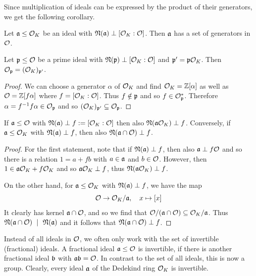 Since multiplication of ideals can be expressed by the product of their generators, we get the following corollary.
\begin{corollary}
    \label{prop:generators_in_order}
    Let $\mathfrak{a} \leq \mathcal{O}_K$ be an ideal with $\mathfrak{N}(\mathfrak{a}) \perp [\mathcal{O}_K : \mathcal{O}]$. Then $\mathfrak{a}$ has a set of generators in $\mathcal{O}$.
\end{corollary}
\begin{prop}
    \label{prop:prime_coprime_localization_same}
    Let $\mathfrak{p} \leq \mathcal{O}$ be a prime ideal with $\mathfrak{N}(\mathfrak{p}) \perp [\mathcal{O}_K : \mathcal{O}]$ and $\mathfrak{p}' = \mathfrak{p}\mathcal{O}_K$.
    Then $\mathcal{O}_{\mathfrak{p}} = (\mathcal{O}_K)_{\mathfrak{p}'}$.
\end{prop}
\begin{proof}
    We can choose a generator $\alpha$ of $\mathcal{O}_K$ and find $\mathcal{O}_K = \mathbb{Z}[\alpha]$ as well as $\mathcal{O} = \mathbb{Z}[f\alpha]$ where $f = [\mathcal{O}_K : \mathcal{O}]$.
    Thus $f \notin \mathfrak{p}$ and so $f \in \mathcal{O}_{\mathfrak{p}}^*$.
    Therefore $\alpha = f^{-1}f\alpha \in \mathcal{O}_{\mathfrak{p}}$ and so $(\mathcal{O}_K)_{\mathfrak{p}'} \subseteq \mathcal{O}_{\mathfrak{p}}$.
\end{proof}
\begin{lemma}
    If $\mathfrak{a} \leq \mathcal{O}$ with $\mathfrak{N}(\mathfrak{a}) \perp f := [\mathcal{O}_K : \mathcal{O}]$ then also $\mathfrak{N}(\mathfrak{a}\mathcal{O}_K) \perp f$.
    Conversely, if $\mathfrak{a} \leq \mathcal{O}_K$ with $\mathfrak{N}(\mathfrak{a}) \perp f$, then also $\mathfrak{N}(\mathfrak{a} \cap \mathcal{O}) \perp f$.
\end{lemma}
\begin{proof}
    For the first statement, note that if $\mathfrak{N}(\mathfrak{a}) \perp f$, then also $\mathfrak{a} \perp f\mathcal{O}$ and so there is a relation $1 = a + fb$ with $a \in \mathfrak{a}$ and $b \in \mathcal{O}$.
    However, then $1 \in \mathfrak{a}\mathcal{O}_K + f\mathcal{O}_K$ and so $\mathfrak{a}\mathcal{O}_K \perp f$, thus $\mathfrak{N}(\mathfrak{a}\mathcal{O}_K) \perp f$.

    On the other hand, for $\mathfrak{a} \leq \mathcal{O}_K$ with $\mathfrak{N}(\mathfrak{a}) \perp f$, we have the map
    \begin{equation*}
        \mathcal{O} \to \mathcal{O}_K/\mathfrak{a}, \quad x \mapsto [x]
    \end{equation*}
    It clearly has kernel $\mathfrak{a} \cap \mathcal{O}$, and so we find that $\mathcal{O}/(\mathfrak{a} \cap \mathcal{O}) \subseteq \mathcal{O}_K/\mathfrak{a}$.
    Thus $\mathfrak{N}(\mathfrak{a} \cap \mathcal{O}) \ \mid \  \mathfrak{N}(\mathfrak{a})$ and it follows that $\mathfrak{N}(\mathfrak{a} \cap \mathcal{O}) \perp f$.
\end{proof}
Instead of all ideals in $\mathcal{O}$, we often only work with the set of invertible (fractional) ideals.
A fractional ideal $\mathfrak{a} \leq \mathcal{O}$ is invertible, if there is another fractional ideal $\mathfrak{b}$ with $\mathfrak{a}\mathfrak{b} = \mathcal{O}$.
In contrast to the set of all ideals, this is now a group.
Clearly, every ideal $\mathfrak{a}$ of the Dedekind ring $\mathcal{O}_K$ is invertible.

